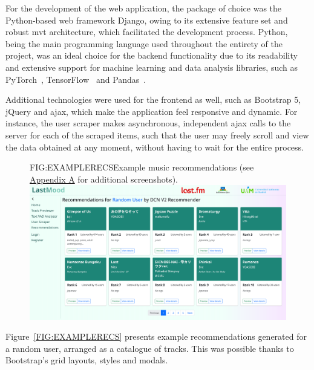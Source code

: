For the development of the web application, the package of choice was the Python-based web framework Django, owing to its extensive feature set and robust \acs{mvt} architecture, which facilitated the development process. Python, being the main programming language used throughout the entirety of the project, was an ideal choice for the backend functionality due to its readability and extensive support for machine learning and data analysis libraries, such as PyTorch~\cite{PYTORCH}, TensorFlow~\cite{TENSORFLOW} and Pandas~\cite{PANDAS}.

Additional technologies were used for the frontend as well, such as Bootstrap 5, jQuery and \acs{ajax}, which make the application feel responsive and dynamic. For instance, the user scraper makes asynchronous, independent \acs{ajax} calls to the server for each of the scraped items, such that the user may freely scroll and view the data obtained at any moment, without having to wait for the entire process.
\vspace{1em}
\begin{figure}[Example music recommendations]{FIG:EXAMPLERECS}{Example music recommendations (see \hyperref[AP:WEBAPP]{Appendix A} for additional screenshots).}\includegraphics[width=1\textwidth]{img/SSRecs.png}
\end{figure}

Figure~\ref{FIG:EXAMPLERECS} presents example recommendations generated for a random user, arranged as a catalogue of tracks. This was possible thanks to Bootstrap's grid layouts, styles and modals.